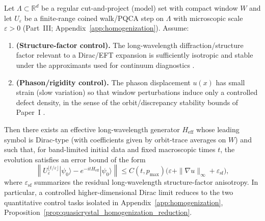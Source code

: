 \begin{conjecture}
\label{conj:quasicrystal_dirac}
Let $\Lambda\subset\mathbb{R}^d$ be a regular cut-and-project (model) set with compact window $W$ and let $U_\varepsilon$ be a finite-range coined walk/PQCA step on $\Lambda$ with microscopic scale $\varepsilon>0$ (Part~III; Appendix~\ref{app:homogenization}). Assume:
\begin{enumerate}
    \item \textbf{(Structure-factor control).} The long-wavelength diffraction/structure factor relevant to a Dirac/EFT expansion is sufficiently isotropic and stable under the approximants used for continuum diagnostics \cite{Hof1995,BaakeGrimm2013AperiodicOrder}.
    \item \textbf{(Phason/rigidity control).} The phason displacement $u(x)$ has small strain (slow variation) so that window perturbations induce only a controlled defect density, in the sense of the orbit/discrepancy stability bounds of Paper~I \cite{Ma2025HPA}.
\end{enumerate}
Then there exists an effective long-wavelength generator $H_{\mathrm{eff}}$ whose leading symbol is Dirac-type (with coefficients given by orbit-trace averages on $W$) and such that, for band-limited initial data and fixed macroscopic times $t$, the evolution satisfies an error bound of the form
\begin{equation}
    \left\|U_\varepsilon^{\lfloor t/\varepsilon\rfloor}|\psi_0\rangle - e^{-it H_{\mathrm{eff}}}|\psi_0\rangle\right\|
    \le C(t,p_{\max})\big(\varepsilon + \|\nabla u\|_\infty + \varepsilon_{\mathrm{sf}}\big),
\end{equation}
where $\varepsilon_{\mathrm{sf}}$ summarizes the residual long-wavelength structure-factor anisotropy. In particular, a controlled higher-dimensional Dirac limit reduces to the two quantitative control tasks isolated in Appendix~\ref{app:homogenization}, Proposition~\ref{prop:quasicrystal_homogenization_reduction}.\par
\end{conjecture}

